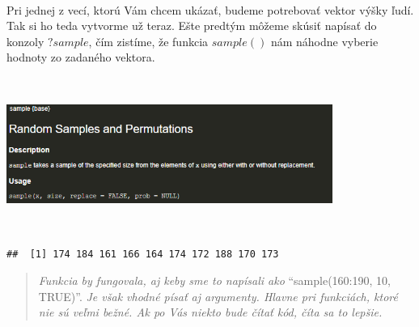 ~

Pri jednej z vecí, ktorú Vám chcem ukázať, budeme potrebovať vektor
výšky ľudí. Tak si ho teda vytvorme už teraz. Ešte predtým môžeme skúsiť
napísať do konzoly \(?sample\), čím zistíme, že funkcia \(sample()\) nám
náhodne vyberie hodnoty zo zadaného vektora.

~

\begin{center}

\includegraphics[width=0.8\textwidth,height=\textheight]{diplomka obrazky/3.png}

\end{center}

~

\begin{Shaded}
\begin{Highlighting}[]



\StringTok{ }\NormalTok{(} \OperatorTok{:}\NormalTok{, } \NormalTok{, } \NormalTok{)}

\end{Highlighting}
\end{Shaded}

\begin{verbatim}
##  [1] 174 184 161 166 164 174 172 188 170 173
\end{verbatim}

\begin{quote}
\emph{Funkcia by fungovala, aj keby sme to napísali ako}
``sample(160:190, 10, TRUE)''. \emph{Je však vhodné písať aj argumenty.
Hlavne pri funkciách, ktoré nie sú veľmi bežné. Ak po Vás niekto bude
čítať kód, číta sa to lepšie.}
\end{quote}

